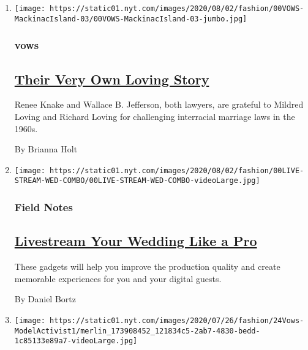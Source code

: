 \begin{enumerate}
\def\labelenumi{\arabic{enumi}.}
\item
  \texttt{[image: https://static01.nyt.com/images/2020/08/02/fashion/00VOWS-MackinacIsland-03/00VOWS-MackinacIsland-03-jumbo.jpg]}

  \hypertarget{vows}{%
  \subsubsection{vows}\label{vows}}

  \hypertarget{their-very-own-loving-story}{%
  \subsection{\texorpdfstring{\href{/2020/07/31/fashion/weddings/Renee-Knake-and-Wallace-Jefferson-wed-tribute-to-Lovings-before-them.html}{Their
  Very Own Loving
  Story}}{Their Very Own Loving Story}}\label{their-very-own-loving-story}}

  Renee Knake and Wallace B. Jefferson, both lawyers, are grateful to
  Mildred Loving and Richard Loving for challenging interracial marriage
  laws in the 1960s.

  By Brianna Holt
\item
  \texttt{[image: https://static01.nyt.com/images/2020/08/02/fashion/00LIVE-STREAM-WED-COMBO/00LIVE-STREAM-WED-COMBO-videoLarge.jpg]}

  \hypertarget{field-notes}{%
  \subsubsection{Field Notes}\label{field-notes}}

  \hypertarget{livestream-your-wedding-like-a-pro}{%
  \subsection{\texorpdfstring{\href{/2020/07/28/fashion/weddings/livestream-your-wedding-like-a-pro.html}{Livestream
  Your Wedding Like a
  Pro}}{Livestream Your Wedding Like a Pro}}\label{livestream-your-wedding-like-a-pro}}

  These gadgets will help you improve the production quality and create
  memorable experiences for you and your digital guests.

  By Daniel Bortz
\item
  \texttt{[image: https://static01.nyt.com/images/2020/07/26/fashion/24Vows-ModelActivist1/merlin\_173908452\_121834c5-2ab7-4830-bedd-1c85133e89a7-videoLarge.jpg]}


\end{enumerate}
